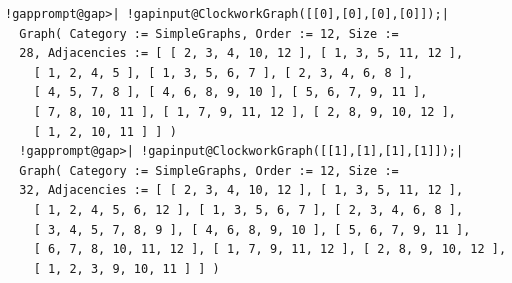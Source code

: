 \documentclass[a4paper,11pt]{report}
\begin{document}
{{{ 
\begin{Verbatim}[commandchars=!@|,fontsize=\small,frame=single,label=Example]
  !gapprompt@gap>| !gapinput@ClockworkGraph([[0],[0],[0],[0]]);|
  Graph( Category := SimpleGraphs, Order := 12, Size := 
  28, Adjacencies := [ [ 2, 3, 4, 10, 12 ], [ 1, 3, 5, 11, 12 ], 
    [ 1, 2, 4, 5 ], [ 1, 3, 5, 6, 7 ], [ 2, 3, 4, 6, 8 ], 
    [ 4, 5, 7, 8 ], [ 4, 6, 8, 9, 10 ], [ 5, 6, 7, 9, 11 ], 
    [ 7, 8, 10, 11 ], [ 1, 7, 9, 11, 12 ], [ 2, 8, 9, 10, 12 ], 
    [ 1, 2, 10, 11 ] ] )
  !gapprompt@gap>| !gapinput@ClockworkGraph([[1],[1],[1],[1]]);|
  Graph( Category := SimpleGraphs, Order := 12, Size := 
  32, Adjacencies := [ [ 2, 3, 4, 10, 12 ], [ 1, 3, 5, 11, 12 ], 
    [ 1, 2, 4, 5, 6, 12 ], [ 1, 3, 5, 6, 7 ], [ 2, 3, 4, 6, 8 ], 
    [ 3, 4, 5, 7, 8, 9 ], [ 4, 6, 8, 9, 10 ], [ 5, 6, 7, 9, 11 ], 
    [ 6, 7, 8, 10, 11, 12 ], [ 1, 7, 9, 11, 12 ], [ 2, 8, 9, 10, 12 ], 
    [ 1, 2, 3, 9, 10, 11 ] ] )
\end{Verbatim}
 

}}}
\end{document}
